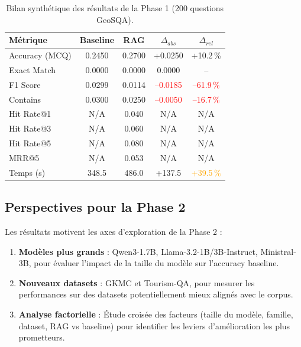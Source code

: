 \documentclass[12pt,a4paper]{article}
\begin{document}
\begin{table}[H]
\centering
\caption{Bilan synthétique des résultats de la Phase 1 (200 questions GeoSQA).}
\label{tab:bilan_phase1}
\begin{tabular}{@{} l c c c c @{}}
\toprule
\textbf{Métrique} & \textbf{Baseline} & \textbf{RAG}
  & \textbf{$\Delta_{abs}$} & \textbf{$\Delta_{rel}$} \\
\midrule
Accuracy (MCQ) & 0.2450 & 0.2700
  & \textcolor{green!60!black}{+0.0250}
  & \textcolor{green!60!black}{+10.2\,\%} \\
Exact Match    & 0.0000 & 0.0000 & 0.0000 & -- \\
F1 Score       & 0.0299 & 0.0114
  & \textcolor{red}{--0.0185}
  & \textcolor{red}{--61.9\,\%} \\
Contains       & 0.0300 & 0.0250
  & \textcolor{red}{--0.0050}
  & \textcolor{red}{--16.7\,\%} \\
\midrule
Hit Rate@1     & N/A    & 0.040  & N/A & N/A \\
Hit Rate@3     & N/A    & 0.060  & N/A & N/A \\
Hit Rate@5     & N/A    & 0.080  & N/A & N/A \\
MRR@5          & N/A    & 0.053  & N/A & N/A \\
\midrule
Temps (s)      & 348.5  & 486.0
  & +137.5 & \textcolor{orange}{+39.5\,\%} \\
\bottomrule
\end{tabular}
\end{table}


\subsection{Perspectives pour la Phase 2}

Les résultats motivent les axes d'exploration de la Phase 2 :

\begin{enumerate}[leftmargin=*]
  \item \textbf{Modèles plus grands} : Qwen3-1.7B, Llama-3.2-1B/3B-Instruct, Ministral-3B, pour évaluer l'impact de la taille du modèle sur l'accuracy baseline.

  \item \textbf{Nouveaux datasets} : GKMC et Tourism-QA, pour mesurer les performances sur des datasets potentiellement mieux alignés avec le corpus.

  \item \textbf{Analyse factorielle} : Étude croisée des facteurs (taille du modèle, famille, dataset, RAG vs baseline) pour identifier les leviers d'amélioration les plus prometteurs.
\end{enumerate}

\newpage


\end{document}
